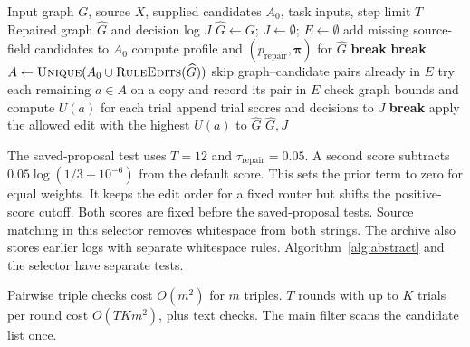 \begin{algorithm}[t]
\caption{Scale-aware edit selection with trial checks}
\label{alg:enhancement}
\begin{algorithmic}[1]
\Require Input graph $G$, source $X$, supplied candidates $A_0$, task inputs, step limit $T$
\Ensure Repaired graph $\widehat G$ and decision log $J$
\State $\widehat G\gets G$; $J\gets\emptyset$; $E\gets\emptyset$
\State add missing source-field candidates to $A_0$
    \State compute profile and $(p_{\mathrm{repair}},\boldsymbol\pi)$ for $\widehat G$
        \State \textbf{break}
    \EndIf
        \State \textbf{break}
    \EndIf
    \State $A\gets\textsc{Unique}(A_0\cup\textsc{RuleEdits}(\widehat G))$
    \State skip graph--candidate pairs already in $E$
    \State try each remaining $a\in A$ on a copy and record its pair in $E$
    \State check graph bounds and compute $U(a)$ for each trial
    \State append trial scores and decisions to $J$
        \State \textbf{break}
    \EndIf
    \State apply the allowed edit with the highest $U(a)$ to $\widehat G$
\EndFor
\State \Return $\widehat G,J$
\end{algorithmic}
\end{algorithm}

The saved-proposal test uses $T=12$ and $\tau_{\mathrm{repair}}=0.05$.
A second score subtracts $0.05\log(1/3+10^{-6})$ from the default score.
This sets the prior term to zero for equal weights.
It keeps the edit order for a fixed router but shifts the positive-score cutoff.
Both scores are fixed before the saved-proposal tests.
Source matching in this selector removes whitespace from both strings.
The archive also stores earlier logs with separate whitespace rules.
Algorithm~\ref{alg:abstract} and the selector have separate tests.

Pairwise triple checks cost $O(m^2)$ for $m$ triples.
$T$ rounds with up to $K$ trials per round cost $O(TKm^2)$, plus text checks.
The main filter scans the candidate list once.
